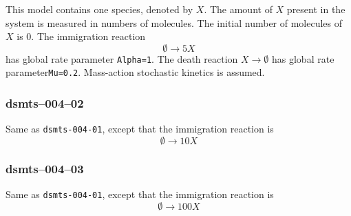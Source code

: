 This model contains one species, denoted by $X$. The amount of $X$
present in the system is measured in numbers of molecules. The initial
number of molecules of $X$ is $0$. The immigration reaction
\[
\emptyset \longrightarrow 5 X
\] 
has global rate parameter
\texttt{Alpha=1}. The death reaction $X\longrightarrow \emptyset$ has
global rate parameter\texttt{Mu=0.2}. Mass-action stochastic kinetics
is assumed.


\subsubsection{dsmts--004--02} 

Same as \verb$dsmts-004-01$, except that the immigration reaction is 
\[
\emptyset \longrightarrow 10 X
\] 


\subsubsection{dsmts--004--03} 

Same as \verb$dsmts-004-01$, except that the immigration reaction is 
\[
\emptyset \longrightarrow 100 X
\] 



